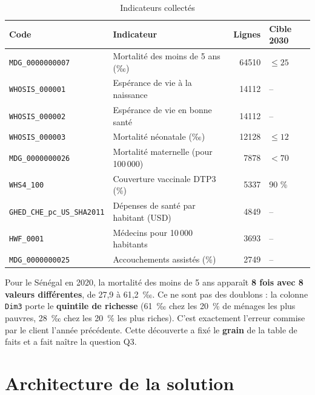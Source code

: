 \documentclass[11pt, a4paper, oneside, headings=normal, numbers=noenddot, DIV=12]{scrartcl}
\begin{document}
\begin{table}[H]
\centering\small
\begin{tabularx}{\linewidth}{@{}l Y r l@{}}
\toprule
\textbf{Code} & \textbf{Indicateur} & \textbf{Lignes} & \textbf{Cible 2030} \\
\midrule
\texttt{MDG\_0000000007} & Mortalité des moins de 5 ans (‰) & \num{64510} & $\leq 25$ \\
\texttt{WHOSIS\_000001} & Espérance de vie à la naissance & \num{14112} & – \\
\texttt{WHOSIS\_000002} & Espérance de vie en bonne santé & \num{14112} & – \\
\texttt{WHOSIS\_000003} & Mortalité néonatale (‰) & \num{12128} & $\leq 12$ \\
\texttt{MDG\_0000000026} & Mortalité maternelle (pour 100\,000) & \num{7878} & $< 70$ \\
\texttt{WHS4\_100} & Couverture vaccinale DTP3 (\%) & \num{5337} & 90 \% \\
\texttt{GHED\_CHE\_pc\_US\_SHA2011} & Dépenses de santé par habitant (USD) & \num{4849} & – \\
\texttt{HWF\_0001} & Médecins pour 10\,000 habitants & \num{3693} & – \\
\texttt{MDG\_0000000025} & Accouchements assistés (\%) & \num{2749} & – \\
\bottomrule
\end{tabularx}
\caption{Indicateurs collectés}
\end{table}

\begin{keybox}
Pour le Sénégal en 2020, la mortalité des moins de 5 ans apparaît \textbf{8 fois avec 8 valeurs différentes}, de 27,9 à 61,2~‰.
Ce ne sont pas des doublons : la colonne \texttt{Dim3} porte le \textbf{quintile de richesse} (61~‰ chez les 20~\% de ménages les plus
pauvres, 28~‰ chez les 20~\% les plus riches). C'est exactement l'erreur commise par le client l'année précédente. Cette découverte a fixé
le \textbf{grain} de la table de faits et a fait naître la question Q3.
\end{keybox}

\section{Architecture de la solution}
\end{document}
